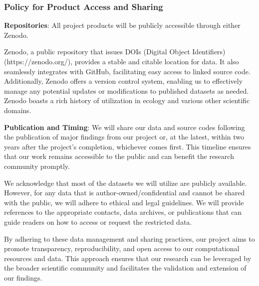 \documentclass[12pt, class=article, crop=false]{standalone}
\begin{document}
\subsubsection*{Policy for Product Access and Sharing}

\textbf{Repositories}: All project products will be publicly accessible through either Zenodo.

Zenodo, a public repository that issues DOIs (Digital Object Identifiers) (https://zenodo.org/), provides a stable and citable location for data.
It also seamlessly integrates with GitHub, facilitating easy access to linked source code.
Additionally, Zenodo offers a version control system, enabling us to effectively manage any potential updates or modifications to published datasets as needed. Zenodo boasts a rich history of utilization in ecology and various other scientific domains.

\textbf{Publication and Timing}: We will share our data and source codes following the publication of major findings from our project or, at the latest, within two years after the project's completion, whichever comes first.
This timeline ensures that our work remains accessible to the public and can benefit the research community promptly.

We acknowledge that most of the datasets we will utilize are publicly available.
However, for any data that is author-owned/confidential and cannot be shared with the public, we will adhere to ethical and legal guidelines.
We will provide references to the appropriate contacts, data archives, or publications that can guide readers on how to access or request the restricted data.

By adhering to these data management and sharing practices, our project aims to promote transparency, reproducibility, and open access to our computational resources and data.
This approach ensures that our research can be leveraged by the broader scientific community and facilitates the validation and extension of our findings.
\end{document}
